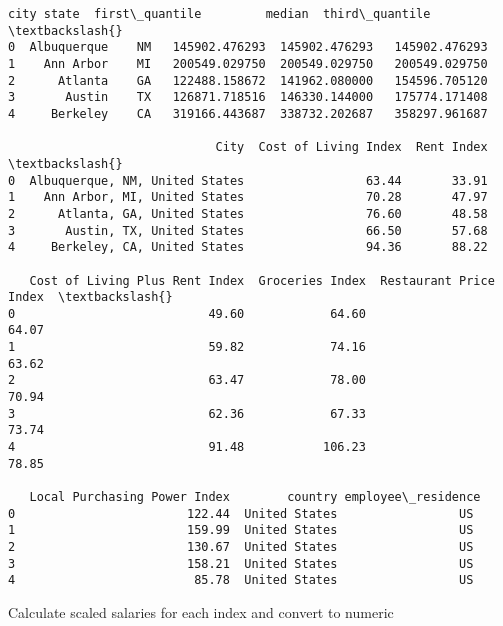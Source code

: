 \documentclass[11pt]{article}
\begin{document}
    \begin{Verbatim}[commandchars=\\\{\}]
          city state  first\_quantile         median  third\_quantile  \textbackslash{}
0  Albuquerque    NM   145902.476293  145902.476293   145902.476293
1    Ann Arbor    MI   200549.029750  200549.029750   200549.029750
2      Atlanta    GA   122488.158672  141962.080000   154596.705120
3       Austin    TX   126871.718516  146330.144000   175774.171408
4     Berkeley    CA   319166.443687  338732.202687   358297.961687

                             City  Cost of Living Index  Rent Index  \textbackslash{}
0  Albuquerque, NM, United States                 63.44       33.91
1    Ann Arbor, MI, United States                 70.28       47.97
2      Atlanta, GA, United States                 76.60       48.58
3       Austin, TX, United States                 66.50       57.68
4     Berkeley, CA, United States                 94.36       88.22

   Cost of Living Plus Rent Index  Groceries Index  Restaurant Price Index  \textbackslash{}
0                           49.60            64.60                   64.07
1                           59.82            74.16                   63.62
2                           63.47            78.00                   70.94
3                           62.36            67.33                   73.74
4                           91.48           106.23                   78.85

   Local Purchasing Power Index        country employee\_residence
0                        122.44  United States                 US
1                        159.99  United States                 US
2                        130.67  United States                 US
3                        158.21  United States                 US
4                         85.78  United States                 US
    \end{Verbatim}

    Calculate scaled salaries for each index and convert to numeric
\end{document}
